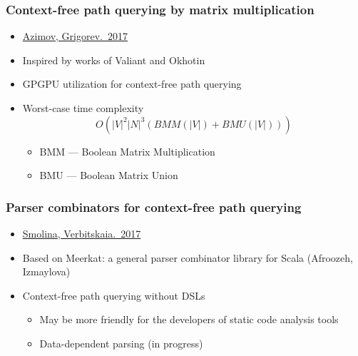 \documentclass[xcolor=table]{beamer}
\begin{document}
\begin{frame}
  \transwipe[direction=90]
  \frametitle{Context-free path querying by matrix multiplication}
  \begin{itemize}
    \item \href{https://arxiv.org/abs/1707.01007}{Azimov, Grigorev.~2017}
    \item Inspired by works of Valiant and Okhotin    
    \item GPGPU utilization for context-free path querying
    \item Worst-case time complexity $$O(|V|^2 |N|^3 (BMM(|V|) + BMU(|V|)))$$
    \begin{itemize}
      \item BMM --- Boolean Matrix Multiplication
      \item BMU --- Boolean Matrix Union
    \end{itemize}

  \end{itemize}
\end{frame}

\begin{frame}
  \transwipe[direction=90]
  \frametitle{Parser combinators for context-free path querying}
  \begin{itemize}
    \item \href{http://plc.sfedu.ru/files/PLC-2017-proceedings.pdf\#page=233}{Smolina, Verbitskaia.~2017}
    \item Based on Meerkat: a general parser combinator library for Scala (Afroozeh, Izmaylova)
    \item Context-free path querying without DSLs
    \begin{itemize}
    \item May be more friendly for the developers of static code analysis tools
    \item Data-dependent parsing (in progress)
    \end{itemize}
  \end{itemize}
\end{frame}
\end{document}
